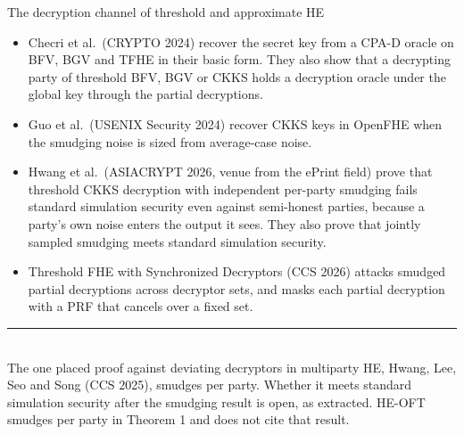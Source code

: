 \documentclass[aspectratio=169,10pt]{beamer}
\newcommand{\redline}{\textcolor{kred}{\rule{\textwidth}{1pt}}}
\begin{document}
\begin{frame}{The decryption channel of threshold and approximate HE}
  \small
  \begin{itemize}
    \item Checri et al.\ (CRYPTO 2024) recover the secret key from a CPA-D oracle on BFV, BGV and TFHE in their basic form. They also show that a decrypting party of threshold BFV, BGV or CKKS holds a decryption oracle under the global key through the partial decryptions.
    \item Guo et al.\ (USENIX Security 2024) recover CKKS keys in OpenFHE when the smudging noise is sized from average-case noise.
    \item Hwang et al.\ (ASIACRYPT 2026, venue from the ePrint field) prove that threshold CKKS decryption with independent per-party smudging fails standard simulation security even against semi-honest parties, because a party's own noise enters the output it sees. They also prove that jointly sampled smudging meets standard simulation security.
    \item Threshold FHE with Synchronized Decryptors (CCS 2026) attacks smudged partial decryptions across decryptor sets, and masks each partial decryption with a PRF that cancels over a fixed set.
  \end{itemize}
  \vspace{0.4em}
  \redline\\[0.4em]
  The one placed proof against deviating decryptors in multiparty HE, Hwang, Lee, Seo and Song (CCS 2025), smudges per party. Whether it meets standard simulation security after the smudging result is open, as extracted. HE-OFT smudges per party in Theorem 1 and does not cite that result.
\end{frame}
\end{document}
